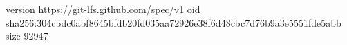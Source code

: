 version https://git-lfs.github.com/spec/v1
oid sha256:304cbdc0abf8645bfdb20fd035aa72926e38f6d48cbc7d76b9a3e5551fde5abb
size 92947
